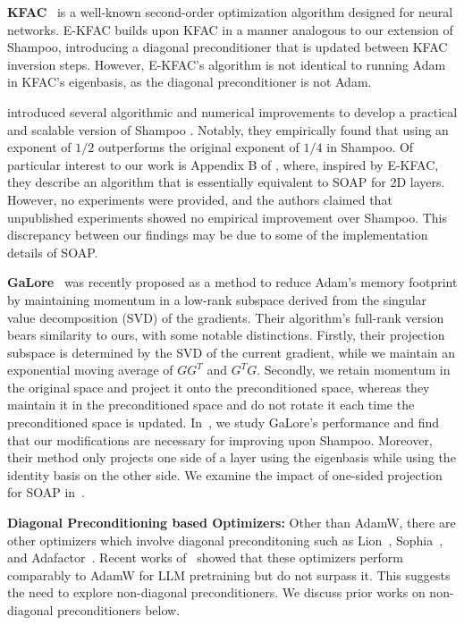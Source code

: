 \documentclass{article}
\begin{document}
\textbf{KFAC}~\citep{martens15} is a well-known second-order optimization algorithm designed 
for neural networks. E-KFAC \citep{ekfac} builds upon KFAC in a manner analogous to 
our extension of Shampoo, introducing a diagonal preconditioner that is updated 
between KFAC inversion steps. However, E-KFAC's algorithm is not identical to running 
Adam in KFAC’s eigenbasis, as the diagonal preconditioner is not Adam.

\citet{anil2020scalable} introduced several algorithmic and numerical improvements to 
develop a practical and scalable version of Shampoo \citep{shampoo}. Notably, they 
empirically found that using an exponent of $1/2$ outperforms the original exponent 
of $1/4$ in Shampoo. Of particular interest to our work is Appendix B of 
\citet{anil2020scalable}, where, inspired by E-KFAC, they describe an algorithm that 
is essentially equivalent to SOAP for 2D layers. However, no experiments were 
provided, and the authors claimed that unpublished experiments showed no empirical 
improvement over Shampoo. This discrepancy between our findings may be due to some of the implementation details of SOAP.

\textbf{GaLore}~\citep{galore} was recently proposed as a method to reduce Adam's memory footprint by 
maintaining momentum in a low-rank subspace derived from the singular value 
decomposition (SVD) of the gradients. Their algorithm’s full-rank version bears 
similarity to ours, with some notable distinctions. Firstly, their projection subspace is 
determined by the SVD of the current gradient, while we maintain an exponential moving 
average of $GG^T$ and $G^TG$. Secondly, we retain momentum in the original space and 
project it onto the preconditioned space, whereas they maintain it in the preconditioned 
space and do not rotate it each time the preconditioned space is updated. In~, we study GaLore's performance and find that our modifications are necessary for improving upon Shampoo. Moreover, their method 
only projects one side of a layer using the eigenbasis while using the identity basis on the other side. We examine the impact of one-sided 
projection for SOAP in~.

\textbf{Diagonal Preconditioning based Optimizers:} Other than AdamW, there are other optimizers which involve diagonal preconditoning such as Lion~\citep{lion}, Sophia~\citep{liu2024sophia}, and Adafactor~\citep{adafactor}. Recent works of~\citet{KaddourKNMK23,zhaoscience} showed that these optimizers perform comparably to AdamW for LLM pretraining but do not surpass it. This suggests the need to explore non-diagonal preconditioners. We discuss prior works on non-diagonal preconditioners below.
\end{document}
